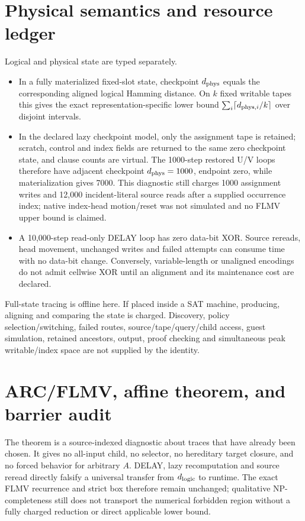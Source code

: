 \documentclass[11pt]{article}
\begin{document}
\section{Physical semantics and resource ledger}
Logical and physical state are typed separately.
\begin{itemize}
\item In a fully materialized fixed-slot state, checkpoint $d_{\rm phys}$ equals
the corresponding aligned logical Hamming distance.  On $k$ fixed writable
tapes this gives the exact representation-specific lower bound
$\sum_i\lceil d_{{\rm phys},i}/k\rceil$ over disjoint intervals.
\item In the declared lazy checkpoint model, only the assignment tape is
retained; scratch, control and index fields are returned to the same zero
checkpoint state, and clause counts are virtual.  The 1000-step restored U/V
loops therefore have adjacent checkpoint $d_{\rm phys}=1000$, endpoint zero,
while materialization gives 7000.  This diagnostic still charges 1000 assignment
writes and 12,000 incident-literal source reads after a supplied occurrence
index; native index-head motion/reset was not simulated and no FLMV upper bound
is claimed.
\item A 10,000-step read-only DELAY loop has zero data-bit XOR.  Source rereads,
head movement, unchanged writes and failed attempts can consume time with no
data-bit change.  Conversely, variable-length or unaligned encodings do not
admit cellwise XOR until an alignment and its maintenance cost are declared.
\end{itemize}
Full-state tracing is offline here.  If placed inside a SAT machine, producing,
aligning and comparing the state is charged.  Discovery, policy
selection/switching, failed routes, source/tape/query/child access, guest
simulation, retained ancestors, output, proof checking and simultaneous peak
writable/index space are not supplied by the identity.

\section{ARC/FLMV, affine theorem, and barrier audit}
The theorem is a source-indexed diagnostic about traces that have already been
chosen.  It gives no all-input child, no selector, no hereditary target closure,
and no forced behavior for arbitrary $A$.  DELAY, lazy recomputation and source
reread directly falsify a universal transfer from $d_{\rm logic}$ to runtime.
The exact FLMV recurrence and strict box therefore remain unchanged; qualitative
NP-completeness still does not transport the numerical forbidden region without
a fully charged reduction or direct applicable lower bound.
\end{document}
